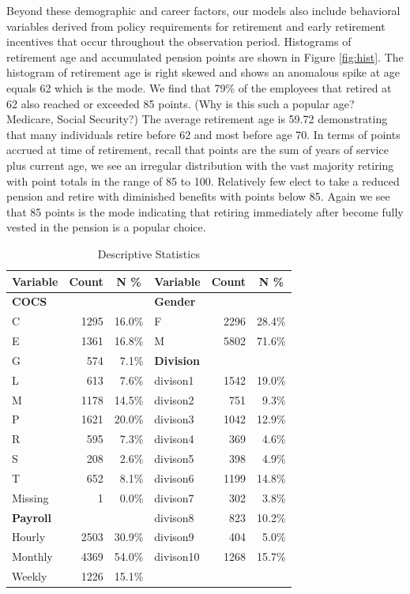 \documentclass[12pt,letterpaper]{article}
\begin{document}
Beyond these demographic and career factors, our models also include behavioral variables derived from policy requirements for retirement and early retirement incentives that occur throughout the observation period. Histograms of retirement age and accumulated pension points are shown in Figure \ref{fig:hist}. The histogram of retirement age is right skewed and shows an anomalous spike at age equals 62 which is the mode.  We find that 79\% of the employees that retired at 62 also reached or exceeded 85 points. (Why is this such a popular age?  Medicare, Social Security?)  The average retirement age is 59.72 demonstrating that many individuals retire before 62 and most before age 70. In terms of points accrued at time of retirement, recall that points are the sum of years of service plus current age, we see an irregular distribution with the vast majority retiring with point totals in the range of 85 to 100. Relatively few elect to take a reduced pension and retire with diminished benefits with points below 85. Again we see that 85 points is the mode indicating that retiring immediately after become fully vested in the pension is a popular choice.
\begin{table}[htbp]
	\centering
	\scriptsize
	\renewcommand{\arraystretch}{1.5}
	\caption{Descriptive Statistics}
	\begin{tabular}{lrrlrr}
		\toprule
		\textbf{Variable}	& \multicolumn{1}{c}{\textbf{Count}} & \multicolumn{1}{c}{\textbf{N \%}}  &   \textbf{Variable}    & \multicolumn{1}{c}{\textbf{Count}} & \multicolumn{1}{c}{\textbf{N \%}} \\
		\midrule
		\textbf{COCS} &       &       & \textbf{Gender} &       &  \\
		C     & 1295  & 16.0\% & F     & 2296  & 28.4\% \\
		E     & 1361  & 16.8\% & M     & 5802  & 71.6\% \\
		G     & 574   & 7.1\% & \textbf{Division} &       &  \\
		L     & 613   & 7.6\% & divison1 & 1542  & 19.0\% \\
		M     & 1178  & 14.5\% & divison2 & 751   & 9.3\% \\
		P     & 1621  & 20.0\% & divison3 & 1042  & 12.9\% \\
		R     & 595   & 7.3\% & divison4 & 369   & 4.6\% \\
		S     & 208   & 2.6\% & divison5 & 398   & 4.9\% \\
		T     & 652   & 8.1\% & divison6 & 1199  & 14.8\% \\
		Missing & 1     & 0.0\% & divison7 & 302   & 3.8\% \\
		\textbf{Payroll} &       &       & divison8 & 823   & 10.2\% \\
		Hourly & 2503  & 30.9\% & divison9 & 404   & 5.0\% \\
		Monthly & 4369  & 54.0\% & divison10 & 1268  & 15.7\% \\
		Weekly & 1226  & 15.1\% &       &       &  \\
		\bottomrule
	\end{tabular}%
	\label{tab:descriptive}%
\end{table}%
\end{document}
